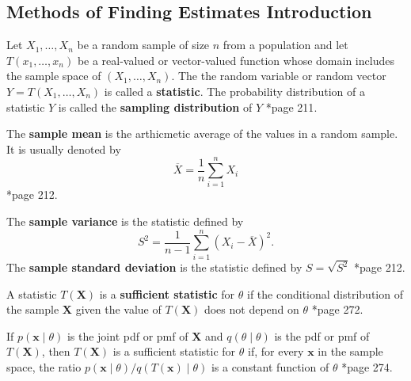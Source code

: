 \subsection*{Methods of Finding Estimates Introduction}

\begin{defe}[Statistic] \label{defe: statistic}
    Let $X_1, \ldots , X_n$ be a random sample of size $n$ from a population and let $T(x_1, \ldots , x_n)$ be a real-valued or vector-valued function whose domain includes the sample space of $(X_1, \ldots , X_n)$. The the random variable or random vector $Y = T(X_1, \ldots , X_n)$ is called a {\bf statistic}. The probability distribution of a statistic $Y$ is called the {\bf sampling distribution} of $Y$ \cite{CasellaGeorge2001SI}*{page 211}.
\end{defe}

\begin{defe} \label{defe: sample_mean}
    The {\bf sample mean} is the arthicmetic average of the values in a random sample. It is usually denoted by
    \begin{equation}
        \overline{X} = \frac{1}{n} \sum_{i=1}^{n} X_i
    \end{equation}
    \cite{CasellaGeorge2001SI}*{page 212}.
\end{defe}

\begin{defe} \label{defe: var_std_dev}
    The {\bf sample variance} is the statistic defined by
    \begin{equation}
        S^2 = \frac{1}{n-1} \sum_{i=1}^{n} (X_i - \overline{X})^2.
    \end{equation}
    The {\bf sample standard deviation} is the statistic defined by $S = \sqrt{S^2}$ \cite{CasellaGeorge2001SI}*{page 212}.
\end{defe}

\begin{defe} \label{defe: sufficient_statistic}
    A statistic $T(\bm{X})$ is a {\bf sufficient statistic} for $\theta$ if the conditional distribution of the sample $\bm{X}$ given the value of $T(\bm{X})$ does not depend on $\theta$ \cite{CasellaGeorge2001SI}*{page 272}.
\end{defe}

\begin{thm} \label{thm: sufficient_statistic_ratio}
    If $p(\bm{x} \mid \theta)$ is the joint pdf or pmf of $\bm{X}$ and $q(\theta \mid \theta)$ is the pdf or pmf of $T(\bm{X})$, then $T(\bm{X})$ is a sufficient statistic for $\theta$ if, for every $\bm{x}$ in the sample space, the ratio $p(\bm{x} \mid \theta) / q(T(\bm{x}) \mid \theta)$ is a constant function of $\theta$ \cite{CasellaGeorge2001SI}*{page 274}.
\end{thm}

